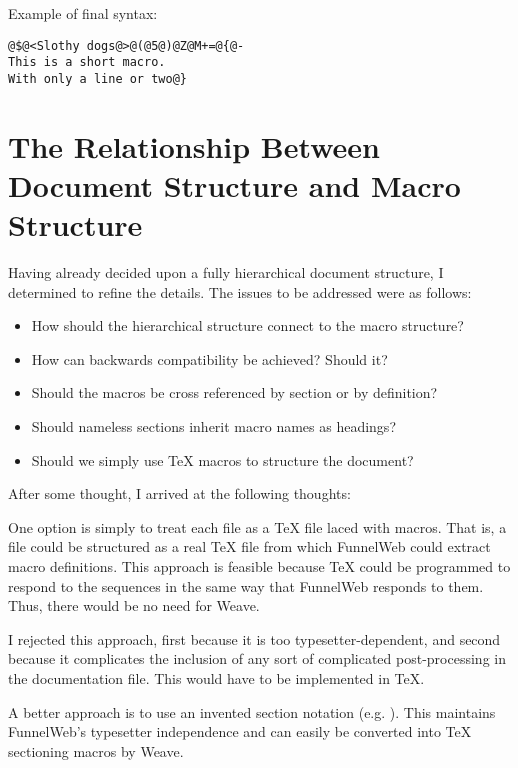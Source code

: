 Example of final syntax:

\begin{verbatim}
@$@<Slothy dogs@>@(@5@)@Z@M+=@{@-
This is a short macro.
With only a line or two@}
\end{verbatim}

\section{The Relationship Between Document Structure and Macro Structure}
%
%

Having already decided upon a fully hierarchical document
structure, I determined to refine the details.
The issues to be addressed were as follows:

\begin{itemize}

\item How should the hierarchical structure connect to the macro structure?
\item How can backwards compatibility be achieved? Should it?
\item Should the macros be cross referenced by section or by definition?
\item Should nameless sections inherit macro names as headings?
\item Should we simply use \TeX{} macros to structure the document?

\end{itemize}

After some thought, I arrived at the following thoughts:

 One option is simply
to treat each  file as a \TeX{} file
laced with macros. That is, a  file could be
structured as a real \TeX{} file from which FunnelWeb could
extract macro definitions. This approach is feasible because 
\TeX{} could be programmed to
respond to the  sequences in the same way that
FunnelWeb responds to them. Thus, there would be no need for Weave.

I rejected this approach, first because it is too typesetter-dependent,
and second because it complicates the inclusion of any sort of
complicated post-processing in the documentation file. This would have to
be implemented in \TeX{}.

A better approach is
to use an invented section notation (e.g. ). This maintains
FunnelWeb's typesetter independence and can easily be
converted into \TeX{} sectioning macros by Weave.

